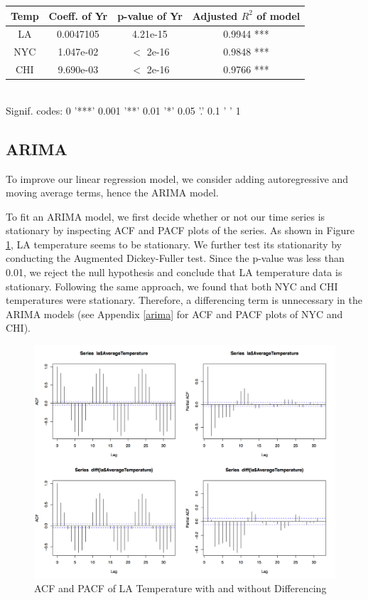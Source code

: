 \documentclass[12pt]{article}
\begin{document}
\begin{center}
    \begin{tabular}{ | c | c | c | c |}
    \hline
    Temp & Coeff. of Yr & p-value of Yr & Adjusted $R^2$ of model\\ \hline
    LA & 0.0047105 & 4.21e-15 & 0.9944  *** \\ \hline
    NYC & 1.047e-02 & $<$ 2e-16 & 0.9848  *** \\ \hline
    CHI & 9.690e-03 & $<$ 2e-16 & 0.9766  *** \\ 
    \hline 
    \end{tabular} \\
    Signif. codes:  0 '***' 0.001 '**' 0.01 '*' 0.05 '.' 0.1 ' ' 1
\end{center}


\subsection{ARIMA}
To improve our linear regression model, we consider adding autoregressive and moving average terms, hence the ARIMA model. 

\vspace{0.5cm}
\noindent To fit an ARIMA model, we first decide whether or not our time series is stationary by inspecting ACF and PACF plots of the series. As shown in Figure \ref{fig:laACF}, LA temperature seems to be stationary. We further test its stationarity by conducting the Augmented Dickey-Fuller test. Since the p-value was less than 0.01, we reject the null hypothesis and conclude that LA temperature data is stationary. Following the same approach, we found that both NYC and CHI temperatures were stationary. Therefore, a differencing term is unnecessary in the ARIMA models (see Appendix \ref{arima} for ACF and PACF plots of NYC and CHI).        

\begin{figure}[H]
    \centering
    \includegraphics[width=\textwidth]{Figures/laACF.png}
    \caption{ACF and PACF of LA Temperature with and without Differencing}
    \label{fig:laACF}
\end{figure}
\end{document}

